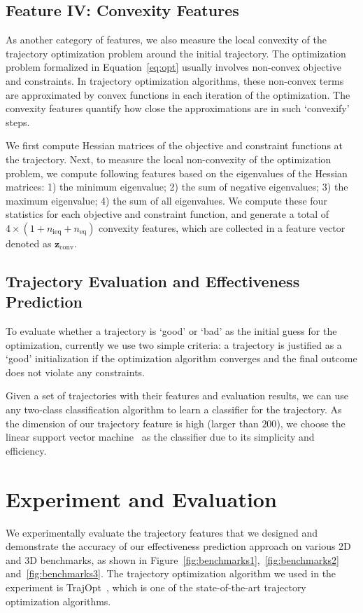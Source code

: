 \documentclass[letterpaper, 10 pt, conference]{ieeeconf}  %
\newcommand{\fconv}{\mbox{$\mathbf z_{\text{conv}}$}}
\begin{document}
\subsection{Feature IV: Convexity Features}
As another category of features, we also measure the local convexity of the trajectory optimization problem around the initial trajectory. 
The optimization problem formalized in Equation~\ref{eq:opt} usually involves non-convex objective and constraints. In trajectory optimization algorithms, these non-convex terms are approximated by convex functions in each iteration of the optimization. The convexity features quantify how close the approximations are in such `convexify' steps.

We first compute Hessian matrices of the objective and constraint functions at the trajectory. Next, to measure the local non-convexity of the optimization problem, we compute following features based on the eigenvalues of the Hessian matrices: 1) the minimum eigenvalue; 2) the sum of negative eigenvalues; 3) the maximum eigenvalue; 4) the sum of all eigenvalues. We compute these four statistics for each objective and constraint function, and generate a total of $4 \times (1 + n_{\text{ieq}} + n_{\text{eq}})$ convexity features, which are collected in a feature vector denoted as $\fconv$.


\subsection{Trajectory Evaluation and Effectiveness Prediction}
To evaluate whether a trajectory is `good' or `bad' as the initial guess for the optimization, currently we use two simple criteria: a trajectory is justified as a `good' initialization if the optimization algorithm converges and the final outcome does not violate any constraints. 

Given a set of trajectories with their features and evaluation results, we can use any two-class classification algorithm to learn a classifier for the trajectory. As the dimension of our trajectory feature is high (larger than $200$), we choose the linear support vector machine~\cite{Fan:2008:LLL} as the classifier due to its simplicity and efficiency.

\section{Experiment and Evaluation}
\label{sec:experiment}
We experimentally evaluate the trajectory features that we designed and demonstrate the accuracy of our effectiveness prediction approach on various 2D and 3D benchmarks, as shown in Figure~\ref{fig:benchmarks1},~\ref{fig:benchmarks2} and~\ref{fig:benchmarks3}. The trajectory optimization algorithm we used in the experiment is TrajOpt~\cite{Schulman:2013:FLO}, which is one of the state-of-the-art trajectory optimization algorithms.
\end{document}

